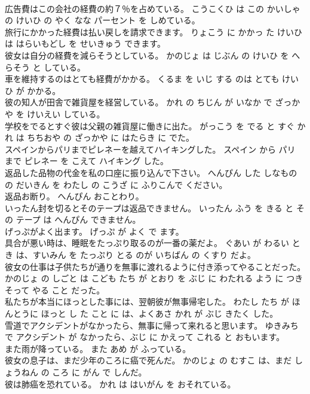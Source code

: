 \documentclass[8pt]{extreport}
\begin{document}
\begin{CJK}{UTF8}{min}
\\	広告費はこの会社の経費の約７％を占めている。	こうこくひ は この かいしゃ の けいひ の やく なな パーセント を しめている。	
\\	旅行にかかった経費は払い戻しを請求できます。	りょこう に かかっ た けいひ は はらいもどし を せいきゅう できます。	
\\	彼女は自分の経費を減らそうとしている。	かのじょ は じぶん の けいひ を へらそう と している。	
\\	車を維持するのはとても経費がかかる。	くるま を いじ する のは とても けいひ が かかる。	
\\	彼の知人が田舎で雑貨屋を経営している。	かれ の ちじん が いなか で ざっかや を けいえい している。	
\\	学校をでるとすぐ彼は父親の雑貨屋に働きに出た。	がっこう を でる と すぐ かれ は ちちおや の ざっかや に はたらき に でた。	
\\	スペインからパリまでピレネーを越えてハイキングした。	スペイン から パリ まで ピレネー を こえて ハイキング した。	
\\	返品した品物の代金を私の口座に振り込んで下さい。	へんぴん した しなもの の だいきん を わたし の こうざ に ふりこんで ください。	
\\	返品お断り。	へんぴん おことわり。	
\\	いったん封を切るとそのテープは返品できません。	いったん ふう を きる と その テープ は へんぴん できません。	
\\	げっぷがよく出ます。	げっぷ が よく で ます。	
\\	具合が悪い時は、睡眠をたっぷり取るのが一番の薬だよ。	ぐあい が わるい とき は、すいみん を たっぷり とる のが いちばん の くすり だよ。	
\\	彼女の仕事は子供たちが通りを無事に渡れるように付き添ってやることだった。	かのじょ の しごと は こども たち が とおり を ぶじ に わたれる よう に つきそって やる こと だった。	
\\	私たちが本当にほっとした事には、翌朝彼が無事帰宅した。	わたし たち が ほんとうに ほっと し た こと に は、よくあさ かれ が ぶじ きたく した。	
\\	雪道でアクシデントがなかったら、無事に帰って来れると思います。	ゆきみち で アクシデント が なかったら、ぶじ に かえって これる と おもいます。	
\\	また雨が降っている。	また あめ が ふっている。	
\\	彼女の息子は、まだ少年のころに癌で死んだ。	かのじょ の むすこ は、まだ しょうねん の ころ に がん で しんだ。	
\\	彼は肺癌を恐れている。	かれ は はいがん を おそれている。	

\end{CJK}
\end{document}
